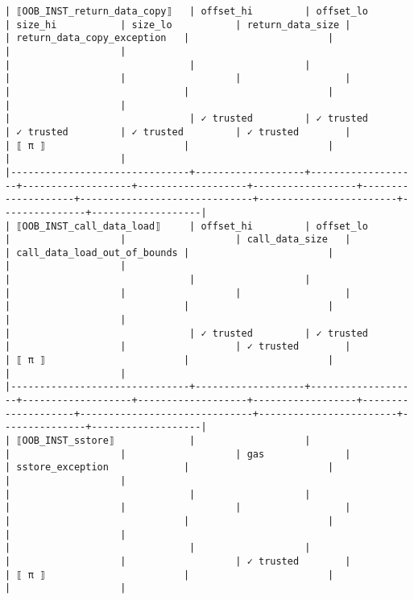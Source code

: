 \documentclass[varwidth=\maxdimen,margin=0.5cm,multi={verbatim}]{standalone}
\begin{document}
\begin{verbatim}
| ⟦OOB_INST_return_data_copy⟧   | offset_hi         | offset_lo         | size_hi           | size_lo           | return_data_size |                    | return_data_copy_exception   |                        |               |                   |
|                               |                   |                   |                   |                   |                  |                    |                              |                        |               |                   |
|                               | ✓ trusted         | ✓ trusted         | ✓ trusted         | ✓ trusted         | ✓ trusted        |                    | ⟦ π ⟧                        |                        |               |                   |
|-------------------------------+-------------------+-------------------+-------------------+-------------------+------------------+--------------------+------------------------------+------------------------+---------------+-------------------|
| ⟦OOB_INST_call_data_load⟧     | offset_hi         | offset_lo         |                   |                   | call_data_size   |                    | call_data_load_out_of_bounds |                        |               |                   |
|                               |                   |                   |                   |                   |                  |                    |                              |                        |               |                   |
|                               | ✓ trusted         | ✓ trusted         |                   |                   | ✓ trusted        |                    | ⟦ π ⟧                        |                        |               |                   |
|-------------------------------+-------------------+-------------------+-------------------+-------------------+------------------+--------------------+------------------------------+------------------------+---------------+-------------------|
| ⟦OOB_INST_sstore⟧             |                   |                   |                   |                   | gas              |                    | sstore_exception             |                        |               |                   |
|                               |                   |                   |                   |                   |                  |                    |                              |                        |               |                   |
|                               |                   |                   |                   |                   | ✓ trusted        |                    | ⟦ π ⟧                        |                        |               |                   |

\end{verbatim}
\end{document}
